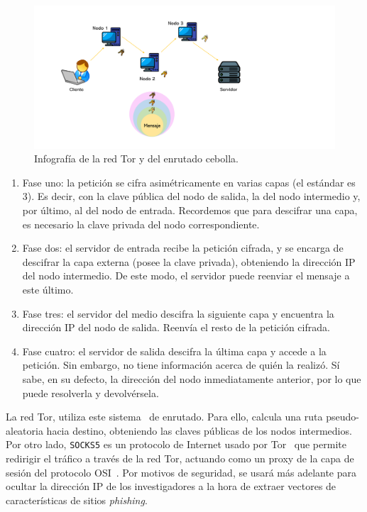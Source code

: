 \begin{figure}[h]
	\caption[Ciberseguridad: enrutado cebolla]{Infografía de la red Tor y del enrutado cebolla.}
	\label{img:red_tor}
	\centering
	\includegraphics[width=\textwidth]{../img/memoria/3_onion_routing.pdf}
\end{figure}

\begin{enumerate}
	\item Fase uno: la petición se cifra asimétricamente en varias capas (el estándar es 3). Es decir, con la clave pública del nodo de salida, la del nodo intermedio y, por último, al del nodo de entrada. Recordemos que para descifrar una capa, es necesario la clave privada del nodo correspondiente.
	\item Fase dos: el servidor de entrada recibe la petición cifrada, y se encarga de descifrar la capa externa (posee la clave privada), obteniendo la dirección IP del nodo intermedio. De este modo, el servidor puede reenviar el mensaje a este último.
	\item Fase tres: el servidor del medio descifra la siguiente capa y encuentra la dirección IP del nodo de salida. Reenvía el resto de la petición cifrada.
	\item Fase cuatro: el servidor de salida descifra la última capa y accede a la petición. Sin embargo, no tiene información acerca de quién la realizó. Sí sabe, en su defecto, la dirección del nodo inmediatamente anterior, por lo que puede resolverla y devolvérsela.
\end{enumerate}

La red Tor, utiliza este sistema~\cite{TorAndrea2022} de enrutado. Para ello, calcula una ruta pseudo-aleatoria hacia destino, obteniendo las claves públicas de los nodos intermedios. Por otro lado, \texttt{SOCKS5} es un protocolo de Internet usado por Tor~\cite{SOCKS5Tor2022} que permite redirigir el tráfico a través de la red Tor, actuando como un proxy de la capa de sesión del protocolo OSI~\cite{RFCSocks5}. Por motivos de seguridad, se usará más adelante para ocultar la dirección IP de los investigadores a la hora de extraer vectores de características de sitios \textit{phishing}.

